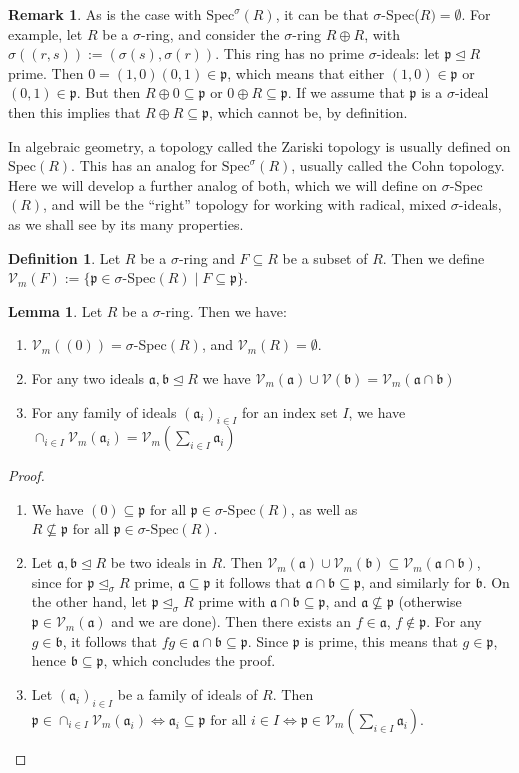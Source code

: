 \documentclass{article}
\def\I{\mathbb{I}}
\def\Vm{\mathcal{V}_m}
\def\V{\mathcal{V}}
\def\a{\mathfrak{a}}
\def\b{\mathfrak{b}}
\def\p{\mathfrak{p}}
\def\s{\sigma}
\def\si{\unlhd_{\sigma}}
\def\Spec{\text{Spec}}
\def\sSpec{\sigma\text{-Spec}}
\def\fa{\text{ for all }}
\newenvironment{bew}{\begin{proof}[Proof]}{\end{proof}}
\theoremstyle{definition}
\newtheorem{rem}[Satz]{Remark}
\newtheorem{defn}[Satz]{Definition}
\newtheorem{lem}[Satz]{Lemma}
\begin{document}
\begin{rem}
As is the case with $\Spec^\s(R)$, it can be that $\s$-Spec($R)= \emptyset$. For example, let $R$ be a $\s$-ring, and consider the $\s$-ring $R \oplus R$, with $\s( (r,s)):= (\s(s),\s(r))$. This ring has no prime $\s$-ideals:
let $\p \unlhd R$ prime. Then $0 = (1,0)(0,1) \in \p$, which means that either $(1,0) \in \p$ or $(0,1) \in \p$. But then $R \oplus 0 \subseteq \p$ or $0 \oplus R \subseteq \p$. If we assume that $\p$ is a $\s$-ideal then
 this implies that $R \oplus R \subseteq \p$, which cannot be, by definition.
\end{rem}

In algebraic geometry, a topology called the Zariski topology is usually defined on $\Spec(R)$. This has an analog for $\Spec^\s(R)$, usually called the Cohn topology. Here we will develop a further analog of both,
 which we will define on $\s$-Spec$(R)$, and will be the ``right'' topology for working with radical, mixed $\s$-ideals, as we shall see by its many properties.

\begin{defn}
Let $R$ be a $\s$-ring and $F \subseteq R$ be a subset of $R$. Then we define $\Vm (F):= \{ \p \in \s$-Spec$(R) \mid F \subseteq \p \}$. 
\end{defn}

\begin{lem}\label{topologywelldef}
Let $R$ be a $\s$-ring. Then we have:
\begin{enumerate}
\item $\Vm((0)) = \s$-Spec$(R)$, and $\Vm(R) = \emptyset$.
\item For any two ideals $\a,\b \unlhd R$ we have $\Vm(\a) \cup \V(\b) = \Vm(\a \cap \b)$
\item For any family of ideals $(\a_i)_{i \in I}$ for an index set $I$, we have $\cap_{i \in I} \Vm(\a_i) = \Vm(\sum_{i \in I} \a_i)$
\end{enumerate}
\begin{bew}
\begin{enumerate}
\item We have $(0) \subseteq \p \fa \p \in \sSpec(R)$, as well as $R \not\subseteq \p \fa \p \in \sSpec(R)$.
\item Let $\a, \b \unlhd R$ be two ideals in $R$. Then $\Vm(\a) \cup \Vm(\b) \subseteq \Vm(\a \cap \b)$, since for $\p \si R$ prime, $\a \subseteq \p$ it follows that $\a \cap \b \subseteq \p$, and similarly for $\b$.
On the other hand, let $\p \si R$ prime with $\a \cap \b \subseteq \p$, and $\a \not\subseteq \p$ (otherwise $\p \in \Vm(\a)$ and we are done). Then there exists an $f \in \a$, $f \notin \p$. 
For any $g \in \b$, it follows that $fg \in \a \cap \b \subseteq \p$. Since $\p$ is prime, this means that $g \in \p$, hence $\b \subseteq \p$, which concludes the proof.
\item Let $(\a_i)_{i \in I}$ be a family  of ideals of $R$. Then $\p \in \cap_{i \in I} \Vm(\a_i) \Leftrightarrow \a_i \subseteq \p \fa i \in I \Leftrightarrow \p \in \Vm(\sum_{i \in I} \a_i)$.
\end{enumerate}
\end{bew}
\end{lem}
\end{document}
